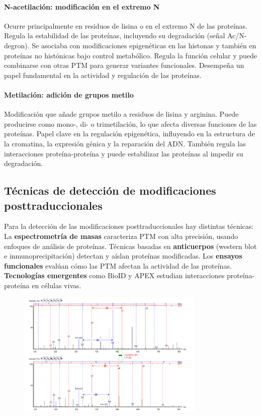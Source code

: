 \paragraph{N-acetilación: modificación en el extremo N}
Ocurre principalmente en residuos de lisina o en el extremo N de las proteínas. Regula la estabilidad de las proteínas, incluyendo su degradación (señal Ac/N-degron). Se asociaba con modificaciones epigenéticas en las histonas y también en proteínas no histónicas bajo control metabólico. Regula la función celular y puede combinarse con otras PTM para generar variantes funcionales. Desempeña un papel fundamental en la actividad y regulación de las proteínas.

\paragraph{Metilación: adición de grupos metilo}
Modificación que añade grupos metilo a residuos de lisina y arginina. Puede producirse como mono-, di- o trimetilación, lo que afecta diversas funciones de las proteínas. Papel clave en la regulación epigenética, influyendo en la estructura de la cromatina, la expresión génica y la reparación del ADN. También regula las interacciones proteína-proteína y puede estabilizar las proteínas al impedir su degradación.

\subsection{Técnicas de detección de modificaciones posttraduccionales}
Para la detección de las modificaciones posttraduccionales hay distintas técnicas: La \textbf{espectrometría de masas} caracteriza PTM con alta precisión, usando enfoques de análisis de proteínas. Técnicas basadas en \textbf{anticuerpos} (western blot e inmunoprecipitación) detectan y aíslan proteínas modificadas. Los \textbf{ensayos funcionales} evalúan cómo las PTM afectan la actividad de las proteínas. \textbf{Tecnologías emergentes} como BioID y APEX estudian interacciones proteína-proteína en células vivas.

\begin{figure}[h]
\centering
\includegraphics[width = 0.8\textwidth]{figs/ms-ptm.png}
\end{figure}